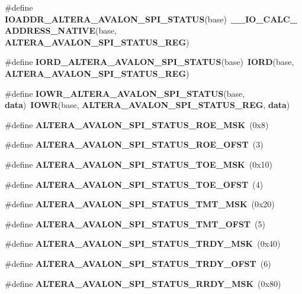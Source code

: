 \begin{DoxyCompactItemize}
\item 
\#define {\bf I\+O\+A\+D\+D\+R\+\_\+\+A\+L\+T\+E\+R\+A\+\_\+\+A\+V\+A\+L\+O\+N\+\_\+\+S\+P\+I\+\_\+\+S\+T\+A\+T\+US}(base)~{\bf \+\_\+\+\_\+\+I\+O\+\_\+\+C\+A\+L\+C\+\_\+\+A\+D\+D\+R\+E\+S\+S\+\_\+\+N\+A\+T\+I\+VE}(base, {\bf A\+L\+T\+E\+R\+A\+\_\+\+A\+V\+A\+L\+O\+N\+\_\+\+S\+P\+I\+\_\+\+S\+T\+A\+T\+U\+S\+\_\+\+R\+EG})
\item 
\#define {\bf I\+O\+R\+D\+\_\+\+A\+L\+T\+E\+R\+A\+\_\+\+A\+V\+A\+L\+O\+N\+\_\+\+S\+P\+I\+\_\+\+S\+T\+A\+T\+US}(base)~{\bf I\+O\+RD}(base, {\bf A\+L\+T\+E\+R\+A\+\_\+\+A\+V\+A\+L\+O\+N\+\_\+\+S\+P\+I\+\_\+\+S\+T\+A\+T\+U\+S\+\_\+\+R\+EG})
\item 
\#define {\bf I\+O\+W\+R\+\_\+\+A\+L\+T\+E\+R\+A\+\_\+\+A\+V\+A\+L\+O\+N\+\_\+\+S\+P\+I\+\_\+\+S\+T\+A\+T\+US}(base,  {\bf data})~{\bf I\+O\+WR}(base, {\bf A\+L\+T\+E\+R\+A\+\_\+\+A\+V\+A\+L\+O\+N\+\_\+\+S\+P\+I\+\_\+\+S\+T\+A\+T\+U\+S\+\_\+\+R\+EG}, {\bf data})
\item 
\#define {\bf A\+L\+T\+E\+R\+A\+\_\+\+A\+V\+A\+L\+O\+N\+\_\+\+S\+P\+I\+\_\+\+S\+T\+A\+T\+U\+S\+\_\+\+R\+O\+E\+\_\+\+M\+SK}~(0x8)
\item 
\#define {\bf A\+L\+T\+E\+R\+A\+\_\+\+A\+V\+A\+L\+O\+N\+\_\+\+S\+P\+I\+\_\+\+S\+T\+A\+T\+U\+S\+\_\+\+R\+O\+E\+\_\+\+O\+F\+ST}~(3)
\item 
\#define {\bf A\+L\+T\+E\+R\+A\+\_\+\+A\+V\+A\+L\+O\+N\+\_\+\+S\+P\+I\+\_\+\+S\+T\+A\+T\+U\+S\+\_\+\+T\+O\+E\+\_\+\+M\+SK}~(0x10)
\item 
\#define {\bf A\+L\+T\+E\+R\+A\+\_\+\+A\+V\+A\+L\+O\+N\+\_\+\+S\+P\+I\+\_\+\+S\+T\+A\+T\+U\+S\+\_\+\+T\+O\+E\+\_\+\+O\+F\+ST}~(4)
\item 
\#define {\bf A\+L\+T\+E\+R\+A\+\_\+\+A\+V\+A\+L\+O\+N\+\_\+\+S\+P\+I\+\_\+\+S\+T\+A\+T\+U\+S\+\_\+\+T\+M\+T\+\_\+\+M\+SK}~(0x20)
\item 
\#define {\bf A\+L\+T\+E\+R\+A\+\_\+\+A\+V\+A\+L\+O\+N\+\_\+\+S\+P\+I\+\_\+\+S\+T\+A\+T\+U\+S\+\_\+\+T\+M\+T\+\_\+\+O\+F\+ST}~(5)
\item 
\#define {\bf A\+L\+T\+E\+R\+A\+\_\+\+A\+V\+A\+L\+O\+N\+\_\+\+S\+P\+I\+\_\+\+S\+T\+A\+T\+U\+S\+\_\+\+T\+R\+D\+Y\+\_\+\+M\+SK}~(0x40)
\item 
\#define {\bf A\+L\+T\+E\+R\+A\+\_\+\+A\+V\+A\+L\+O\+N\+\_\+\+S\+P\+I\+\_\+\+S\+T\+A\+T\+U\+S\+\_\+\+T\+R\+D\+Y\+\_\+\+O\+F\+ST}~(6)
\item 
\#define {\bf A\+L\+T\+E\+R\+A\+\_\+\+A\+V\+A\+L\+O\+N\+\_\+\+S\+P\+I\+\_\+\+S\+T\+A\+T\+U\+S\+\_\+\+R\+R\+D\+Y\+\_\+\+M\+SK}~(0x80)
\item 

\end{DoxyCompactItemize}
